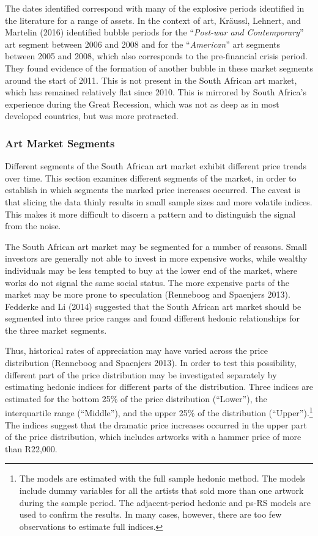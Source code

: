 \documentclass[]{elsarticle} %
\begin{document}
The dates identified correspond with many of the explosive periods
identified in the literature for a range of assets. In the context of
art, Kräussl, Lehnert, and Martelin (2016) identified bubble periods for
the ``\emph{Post-war and Contemporary}'' art segment between 2006 and
2008 and for the ``\emph{American}'' art segments between 2005 and 2008,
which also corresponds to the pre-financial crisis period. They found
evidence of the formation of another bubble in these market segments
around the start of 2011. This is not present in the South African art
market, which has remained relatively flat since 2010. This is mirrored
by South Africa's experience during the Great Recession, which was not
as deep as in most developed countries, but was more protracted.

\subsubsection{Art Market Segments}\label{art-market-segments}

Different segments of the South African art market exhibit different
price trends over time. This section examines different segments of the
market, in order to establish in which segments the marked price
increases occurred. The caveat is that slicing the data thinly results
in small sample sizes and more volatile indices. This makes it more
difficult to discern a pattern and to distinguish the signal from the
noise.

The South African art market may be segmented for a number of reasons.
Small investors are generally not able to invest in more expensive
works, while wealthy individuals may be less tempted to buy at the lower
end of the market, where works do not signal the same social status. The
more expensive parts of the market may be more prone to speculation
(Renneboog and Spaenjers 2013). Fedderke and Li (2014) suggested that
the South African art market should be segmented into three price ranges
and found different hedonic relationships for the three market segments.

Thus, historical rates of appreciation may have varied across the price
distribution (Renneboog and Spaenjers 2013). In order to test this
possibility, different part of the price distribution may be
investigated separately by estimating hedonic indices for different
parts of the distribution. Three indices are estimated for the bottom
25\% of the price distribution (``Lower''), the interquartile range
(``Middle''), and the upper 25\% of the distribution
(``Upper'').\footnote{The models are estimated with the full sample
  hedonic method. The models include dummy variables for all the artists
  that sold more than one artwork during the sample period. The
  adjacent-period hedonic and ps-RS models are used to confirm the
  results. In many cases, however, there are too few observations to
  estimate full indices.} The indices suggest that the dramatic price
increases occurred in the upper part of the price distribution, which
includes artworks with a hammer price of more than R22,000.
\end{document}
